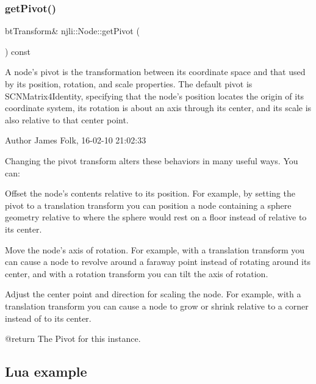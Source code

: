 \begin{DoxyCodeInclude}
\end{DoxyCodeInclude}
\mbox{\label{classnjli_1_1_node_aa3d0fa27774066836af2b64346641779}} 
\subsubsection{\texorpdfstring{get\+Pivot()}{getPivot()}}
{\footnotesize\ttfamily bt\+Transform\& njli\+::\+Node\+::get\+Pivot (\begin{DoxyParamCaption}{ }\end{DoxyParamCaption}) const}



A node’s pivot is the transformation between its coordinate space and that used by its position, rotation, and scale properties. The default pivot is S\+C\+N\+Matrix4\+Identity, specifying that the node’s position locates the origin of its coordinate system, its rotation is about an axis through its center, and its scale is also relative to that center point. 

\begin{DoxyAuthor}{Author}
James Folk, 16-\/02-\/10 21\+:02\+:33
\end{DoxyAuthor}
Changing the pivot transform alters these behaviors in many useful ways. You can\+:

Offset the node’s contents relative to its position. For example, by setting the pivot to a translation transform you can position a node containing a sphere geometry relative to where the sphere would rest on a floor instead of relative to its center.

Move the node’s axis of rotation. For example, with a translation transform you can cause a node to revolve around a faraway point instead of rotating around its center, and with a rotation transform you can tilt the axis of rotation.

Adjust the center point and direction for scaling the node. For example, with a translation transform you can cause a node to grow or shrink relative to a corner instead of to its center. \begin{DoxyVerb} @return The Pivot for this instance.
\end{DoxyVerb}
\hypertarget{classnjli_1_1_steering_behavior_wander_ex1}{}\subsection{Lua example}\label{classnjli_1_1_steering_behavior_wander_ex1}


